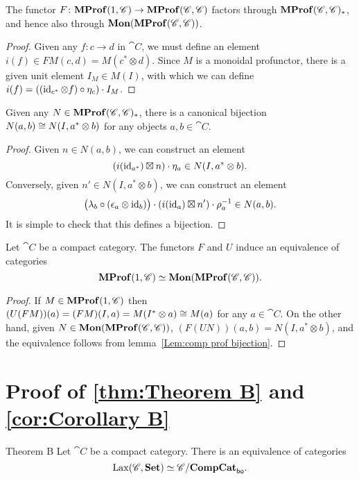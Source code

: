 \documentclass[12pt,oneside,article,draft]{memoir}
\begin{document}
\begin{proposition}\label{Prop:canonical unit}
	The functor $F\colon\mathbf{MProf}(1,\mathscr{C})\to\mathbf{MProf}(\mathscr{C},\mathscr{C})$ factors through $\mathbf{MProf}(\mathscr{C},\mathscr{C})_*$, and hence also through $\mathbf{Mon}(\mathbf{MProf}(\mathscr{C},\mathscr{C}))$.
\end{proposition}
\begin{proof}
	Given any $f\colon c\to d$ in $\cat{C}$, we must define an element $i(f)\in FM(c,d)=M(c^*\otimes d)$. Since $M$ is a monoidal profunctor, there is a given unit element $I_M\in M(I)$, with which we can define $i(f)=((\operatorname{id}_{c^*}\otimes f)\circ\eta_c)\cdot I_M$.
\end{proof}

\begin{lemma}\label{Lem:comp prof bijection}
  Given any $N\in\mathbf{MProf}(\mathscr{C},\mathscr{C})_*$, there is a canonical bijection $N(a,b)\cong N(I,a^*\otimes b)$ for any objects $a,b\in\cat{C}$.
\end{lemma}
\begin{proof}
  Given $n\in N(a,b)$, we can construct an element
  \[
    (i(\operatorname{id}_{a^*})\boxtimes n)\cdot\eta_a \in N(I,a^*\otimes b).
  \]
  Conversely, given $n'\in N(I,a^*\otimes b)$, we can construct an element 
  \[
    \bigl(\lambda_b\circ(\epsilon_a\otimes\operatorname{id}_b)\bigr)\cdot(i(\operatorname{id}_a)\boxtimes n')\cdot\rho_a^{-1} \in N(a,b).
  \]
  It is simple to check that this defines a bijection.
\end{proof}

\begin{proposition}\label{Prop:mon prof equivalence}
	Let $\cat{C}$ be a compact category. The functors $F$ and $U$ induce an equivalence of categories 
  \[
    \mathbf{MProf}(1,\mathscr{C})\simeq\mathbf{Mon}(\mathbf{MProf}(\mathscr{C},\mathscr{C})).
  \]
\end{proposition}
\begin{proof}
  If $M\in\mathbf{MProf}(1,\mathscr{C})$ then $(U(FM))(a)=(FM)(I,a)=M(I^*\otimes a)\cong M(a)$ for any $a\in\cat{C}$. On the other hand, given $N\in\mathbf{Mon}(\mathbf{MProf}(\mathscr{C},\mathscr{C}))$, $(F(UN))(a,b)=N(I,a^*\otimes b)$, and the equivalence follows from lemma~\ref{Lem:comp prof bijection}.
\end{proof}

\section{Proof of \ref{thm:Theorem B} and \ref{cor:Corollary B}}\label{sec:proof of Bs}

 \begin{named}{Theorem B}
 	Let $\cat{C}$ be a compact category. There is an equivalence of categories
  \[
    \operatorname{Lax}(\mathscr{C},\mathbf{Set})\simeq\mathscr{C}/\mathbf{CompCat}_{\mathsf{bo}}.
  \]
 \end{named}
\end{document}
